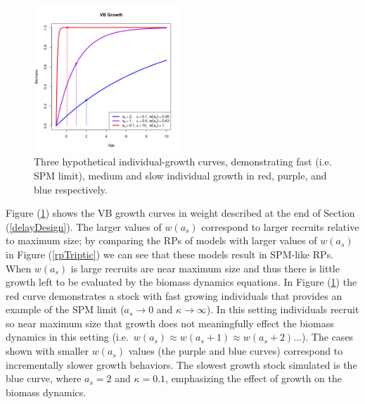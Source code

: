 \begin{figure}
\vspace{-0.5cm}
\includegraphics[width=0.49\textwidth]{../ddBias/vbCurves.png}
\caption{Three hypothetical individual-growth curves, demonstrating 
fast (i.e. SPM limit), medium and slow individual growth in red, 
purple, and blue respectively.
\label{vbCurves}}
\end{figure}
%
Figure (\ref{vbCurves}) shows the VB growth curves in weight
described at the end of Section (\ref{delayDesign}). %
The larger values of $w(a_s)$ correspond to larger recruits relative 
to maximum size; by comparing the RPs of models with larger values of 
$w(a_s)$ in Figure (\ref{rpTriptic}) we can see that these models result in SPM-like RPs.
When $w(a_s)$ is large recruits are near maximum size and thus there is little growth left 
to be evaluated by the biomass dynamics equations. In Figure (\ref{vbCurves}) the red curve 
demonstrates a stock with fast growing individuals that provides an example of the SPM limit 
($a_s\rightarrow0$ and $\kappa\rightarrow\infty$). In this setting individuals recruit so near maximum size that 
growth does not meaningfully effect the biomass dynamics in this setting \mbox{(i.e. $w(a_s)\approx w(a_s+1)\approx w(a_s+2)...$).}
The cases shown with smaller $w(a_s)$ values (the purple and blue curves) correspond to 
incrementally slower growth behaviors. The slowest growth stock simulated is the blue curve, 
where $a_s=2$ and $\kappa=0.1$, emphasizing the effect of growth on the biomass dynamics. 

